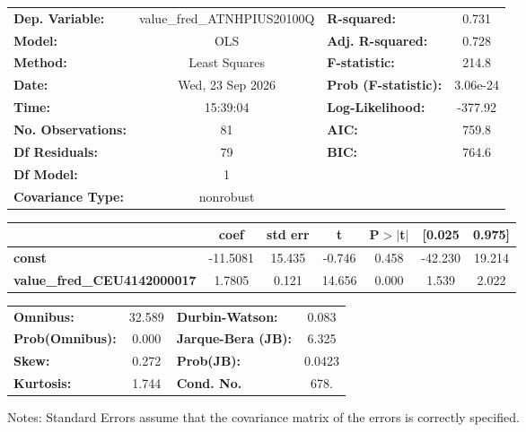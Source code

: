 \begin{center}
\begin{tabular}{lclc}
\toprule
\textbf{Dep. Variable:}             & value\_fred\_ATNHPIUS20100Q & \textbf{  R-squared:         } &     0.731   \\
\textbf{Model:}                     &             OLS             & \textbf{  Adj. R-squared:    } &     0.728   \\
\textbf{Method:}                    &        Least Squares        & \textbf{  F-statistic:       } &     214.8   \\
\textbf{Date:}                      &       Wed, 23 Sep 2026      & \textbf{  Prob (F-statistic):} &  3.06e-24   \\
\textbf{Time:}                      &           15:39:04          & \textbf{  Log-Likelihood:    } &   -377.92   \\
\textbf{No. Observations:}          &                81           & \textbf{  AIC:               } &     759.8   \\
\textbf{Df Residuals:}              &                79           & \textbf{  BIC:               } &     764.6   \\
\textbf{Df Model:}                  &                 1           & \textbf{                     } &             \\
\textbf{Covariance Type:}           &          nonrobust          & \textbf{                     } &             \\
\bottomrule
\end{tabular}
\begin{tabular}{lcccccc}
                                    & \textbf{coef} & \textbf{std err} & \textbf{t} & \textbf{P$> |$t$|$} & \textbf{[0.025} & \textbf{0.975]}  \\
\midrule
\textbf{const}                      &     -11.5081  &       15.435     &    -0.746  &         0.458        &      -42.230    &       19.214     \\
\textbf{value\_fred\_CEU4142000017} &       1.7805  &        0.121     &    14.656  &         0.000        &        1.539    &        2.022     \\
\bottomrule
\end{tabular}
\begin{tabular}{lclc}
\textbf{Omnibus:}       & 32.589 & \textbf{  Durbin-Watson:     } &    0.083  \\
\textbf{Prob(Omnibus):} &  0.000 & \textbf{  Jarque-Bera (JB):  } &    6.325  \\
\textbf{Skew:}          &  0.272 & \textbf{  Prob(JB):          } &   0.0423  \\
\textbf{Kurtosis:}      &  1.744 & \textbf{  Cond. No.          } &     678.  \\
\bottomrule
\end{tabular}
\end{center}

Notes: \newline
 [1] Standard Errors assume that the covariance matrix of the errors is correctly specified.